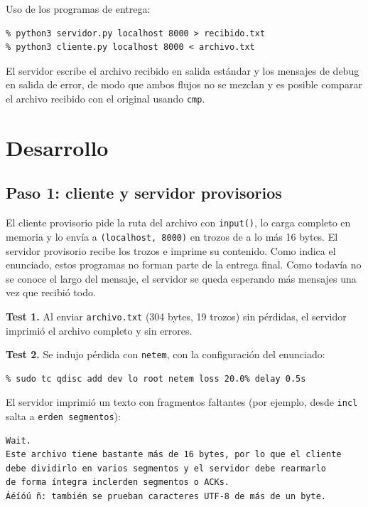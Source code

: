 \documentclass[11pt,letterpaper]{article}
\begin{document}
Uso de los programas de entrega:

\begin{lstlisting}
% python3 servidor.py localhost 8000 > recibido.txt
% python3 cliente.py localhost 8000 < archivo.txt
\end{lstlisting}

El servidor escribe el archivo recibido en salida estándar y los mensajes de debug en
salida de error, de modo que ambos flujos no se mezclan y es posible comparar el archivo
recibido con el original usando \texttt{cmp}.

\section{Desarrollo}

\subsection{Paso 1: cliente y servidor provisorios}

El cliente provisorio pide la ruta del archivo con \texttt{input()}, lo carga completo
en memoria y lo envía a \texttt{(localhost, 8000)} en trozos de a lo más 16 bytes. El
servidor provisorio recibe los trozos e imprime su contenido. Como indica el enunciado,
estos programas no forman parte de la entrega final. Como todavía no se
conoce el largo del mensaje, el servidor se queda esperando más mensajes una vez que
recibió todo.

\textbf{Test 1.} Al enviar \texttt{archivo.txt} (304 bytes, 19 trozos) sin pérdidas, el
servidor imprimió el archivo completo y sin errores.

\textbf{Test 2.} Se indujo pérdida con \texttt{netem}, con la configuración del
enunciado:

\begin{lstlisting}
% sudo tc qdisc add dev lo root netem loss 20.0% delay 0.5s
\end{lstlisting}

El servidor imprimió un texto con fragmentos faltantes (por ejemplo, desde
\texttt{incl} salta a \texttt{erden segmentos}):

\begin{lstlisting}
Wait.
Este archivo tiene bastante más de 16 bytes, por lo que el cliente
debe dividirlo en varios segmentos y el servidor debe rearmarlo
de forma íntegra inclerden segmentos o ACKs.
Áéíóú ñ: también se prueban caracteres UTF-8 de más de un byte.
\end{lstlisting}
\end{document}
